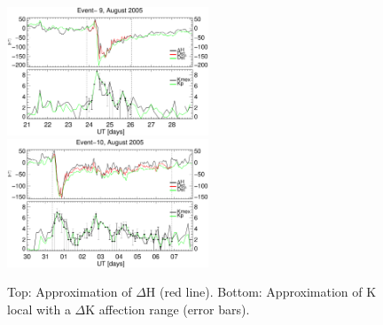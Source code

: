 \documentclass[a4paper,fleqn]{cas-dc}
\begin{document}
\begin{figure}[h!]
       \centerline{\Large \bf   
      \hspace{0.275\textwidth}  \color{black}{}
       \hspace{0.295\textwidth}  \color{black}{}
         \hfill}
       \includegraphics[width=6.0cm]{images/dH_approx/diono_valid_V4_2005-08-21.eps}     
       \includegraphics[width=6.0cm]{images/dH_approx/diono_valid_V4_2005-08-30.eps}
       
       \caption{Top: Approximation of $\Delta$H (red line). Bottom: Approximation of K local with a $\Delta$K affection range (error bars). }
    \label{fig:iono_valid2}
\end{figure}
\end{document}
